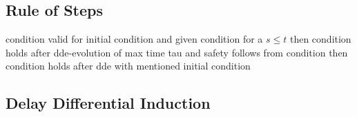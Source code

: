 \documentclass[10pt]{report}
\begin{document}
        \subsection{Rule of Steps}
            \label{sec:rule-of-steps}

            condition valid for initial condition and given condition for a $s\leq t$ then condition holds after dde-evolution of max time tau and safety follows from condition then condition holds after dde with mentioned initial condition

            \begin{calculus}
            \end{calculus}

        \subsection{Delay Differential Induction}
            \label{sec:delay-differential-induction}

            \begin{calculus}
            \end{calculus}
\end{document}
